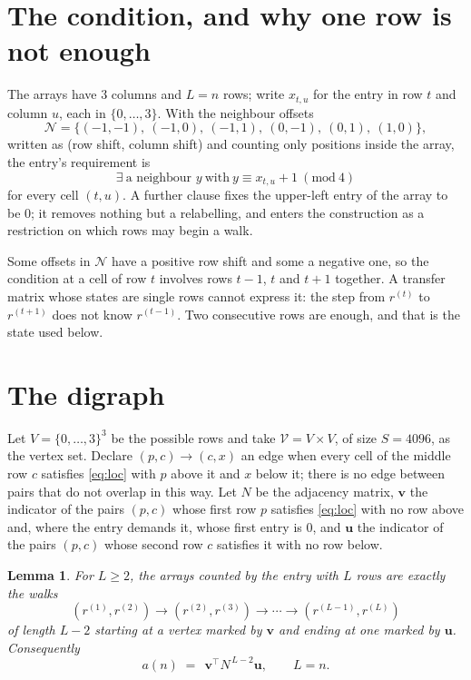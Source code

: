 \documentclass[11pt,a4paper]{article}
\theoremstyle{plain}
\newtheorem{lemma}[theorem]{Lemma}
\theoremstyle{definition}
\begin{document}
\section{The condition, and why one row is not enough}

The arrays have $3$ columns and $L=n$ rows; write $x_{t,u}$ for the entry in
row $t$ and column $u$, each in $\{0,\dots,3\}$. With the neighbour offsets
\[
\mathcal N=\{(-1,-1),\ (-1,0),\ (-1,1),\ (0,-1),\ (0,1),\ (1,0)\},
\]
written as (row shift, column shift) and counting only positions inside the array, the
entry's requirement is
\begin{equation}\label{eq:loc}
\exists\ \text{a neighbour }y\ \text{with}\ y\equiv x_{t,u}+1\ (\mathrm{mod}\ 4)
\end{equation}
for every cell $(t,u)$. A further clause fixes the upper-left entry of the array to be $0$; it removes nothing but a relabelling, and enters the construction as a restriction on which rows may begin a walk.

Some offsets in $\mathcal N$ have a positive row shift and some a negative one, so the
condition at a cell of row $t$ involves rows $t-1$, $t$ and $t+1$ together. A transfer
matrix whose states are single rows cannot express it: the step from $r^{(t)}$ to
$r^{(t+1)}$ does not know $r^{(t-1)}$. Two consecutive rows are enough, and that is
the state used below.

\section{The digraph}

Let $V=\{0,\dots,3\}^{3}$ be the possible rows and take
$\mathcal V=V\times V$, of size $S=4096$, as the vertex set. Declare $(p,c)\to(c,x)$ an edge
when every cell of the middle row $c$ satisfies \eqref{eq:loc} with $p$ above it and $x$
below it; there is no edge between pairs that do not overlap in this way. Let $N$ be the
adjacency matrix, $\mathbf{v}$ the indicator of the pairs $(p,c)$ whose first row $p$
satisfies \eqref{eq:loc} with no row above and, where the entry demands it, whose first entry is $0$, and $\mathbf{u}$ the indicator of
the pairs $(p,c)$ whose second row $c$ satisfies it with no row below.

\begin{lemma}\label{lem:walk}
For $L\ge2$, the arrays counted by the entry with $L$ rows are exactly the walks
\[
(r^{(1)},r^{(2)})\to(r^{(2)},r^{(3)})\to\cdots\to(r^{(L-1)},r^{(L)})
\]
of length $L-2$ starting at a vertex marked by $\mathbf{v}$ and ending at one marked by
$\mathbf{u}$. Consequently
\[
a(n)\;=\;\,\mathbf{v}^{\!\top}N^{\,L-2}\mathbf{u},\qquad L=n .
\]
\end{lemma}
\end{document}
